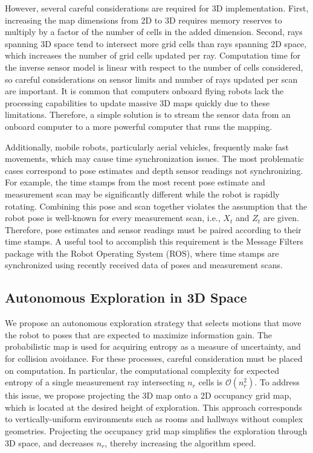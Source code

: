 \documentclass[smallextended]{svjour3}       %
\begin{document}
However, several careful considerations are required for 3D implementation. First, increasing the map dimensions from 2D to 3D requires memory reserves to multiply by a factor of the number of cells in the added dimension. Second, rays spanning 3D space tend to intersect more grid cells than rays spanning 2D space, which increases the number of grid cells updated per ray. Computation time for the inverse sensor model is linear with respect to the number of cells considered, so careful considerations on sensor limits and number of rays updated per scan are important.
It is common that computers onboard flying robots lack the processing capabilities to update massive 3D maps quickly due to these limitations. Therefore, a simple solution is to stream the sensor data from an onboard computer to a more powerful computer that runs the mapping.

Additionally, mobile robots, particularly aerial vehicles, frequently make fast movements, which may cause time synchronization issues. The most problematic cases correspond to pose estimates and depth sensor readings not synchronizing. For example, the time stamps from the most recent pose estimate and measurement scan may be significantly different while the robot is rapidly rotating. Combining this pose and scan together violates the assumption that the robot pose is well-known for every measurement scan, i.e., $X_t$ and $Z_t$ are given. Therefore, pose estimates and sensor readings must be paired according to their time stamps. A useful tool to accomplish this requirement is the Message Filters package with the Robot Operating System (ROS), where time stamps are synchronized using recently received data of poses and measurement scans.

\subsection{Autonomous Exploration in 3D Space}

We propose an autonomous exploration strategy that selects motions that move the robot to poses that are expected to maximize information gain. The probabilistic map is used for acquiring entropy as a measure of uncertainty, and for collision avoidance. For these processes, careful consideration must be placed on computation. In particular, the computational complexity for expected entropy of a single measurement ray intersecting $n_r$ cells is $\mathcal O(n_r^2)$. To address this issue, we propose projecting the 3D map onto a 2D occupancy grid map, which is located at the desired height of exploration. This approach corresponds to vertically-uniform environments such as rooms and hallways without complex geometries. Projecting the occupancy grid map simplifies the exploration through 3D space, and decreases $n_r$, thereby increasing the algorithm speed.
\end{document}
